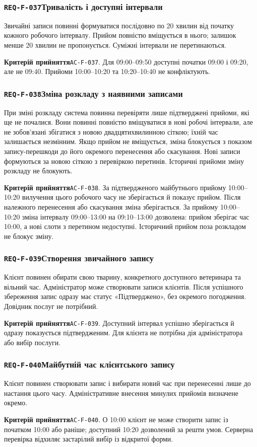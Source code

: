 \documentclass[11pt,a4paper]{article}
\newcommand{\requirement}[4]{%
  \Needspace{7\baselineskip}%
  \subsubsection*{\hypertarget{#1}{\texttt{#1}}\quad #2}%
  #3\par
  \textbf{Критерій прийняття}\quad #4\par\medskip}
\begin{document}
\requirement{REQ-F-037}{Тривалість і доступні інтервали}{Звичайні записи повинні формуватися послідовно по 20 хвилин від початку кожного робочого інтервалу. Прийом повністю вміщується в нього; залишок менше 20 хвилин не пропонується. Суміжні інтервали не перетинаються.}{\hypertarget{AC-F-037}{\texttt{AC-F-037}}. Для 09:00–09:50 доступні початки 09:00 і 09:20, але не 09:40. Прийоми 10:00–10:20 та 10:20–10:40 не конфліктують.}

\requirement{REQ-F-038}{Зміна розкладу з наявними записами}{При зміні розкладу система повинна перевіряти лише підтверджені прийоми, які ще не почалися. Вони повинні повністю вміщуватися в нові робочі інтервали, але не зобов’язані збігатися з новою двадцятихвилинною сіткою; їхній час залишається незмінним. Якщо прийом не вміщується, зміна блокується з показом запису-перешкоди до його окремого перенесення або скасування. Нові записи формуються за новою сіткою з перевіркою перетинів. Історичні прийоми зміну розкладу не блокують.}{\hypertarget{AC-F-038}{\texttt{AC-F-038}}. За підтвердженого майбутнього прийому 10:00–10:20 вилучення цього робочого часу не зберігається й показує прийом. Після належного перенесення або скасування зміна зберігається. За прийому 10:00–10:20 зміна інтервалу 09:00–13:00 на 09:10–13:00 дозволена: прийом зберігає час 10:00, а нові слоти з перетином недоступні. Історичний прийом поза розкладом не блокує зміну.}

\requirement{REQ-F-039}{Створення звичайного запису}{Клієнт повинен обирати свою тварину, конкретного доступного ветеринара та вільний час. Адміністратор може створювати записи клієнтів. Після успішного збереження запис одразу має статус «Підтверджено», без окремого погодження. Довідник послуг не потрібний.}{\hypertarget{AC-F-039}{\texttt{AC-F-039}}. Доступний інтервал успішно зберігається й одразу показується підтвердженим. Для клієнта не потрібна дія адміністратора або вибір послуги.}

\requirement{REQ-F-040}{Майбутній час клієнтського запису}{Клієнт повинен створювати запис і вибирати новий час при перенесенні лише до настання цього часу. Адміністративне внесення минулих прийомів визначене окремо.}{\hypertarget{AC-F-040}{\texttt{AC-F-040}}. О 10:00 клієнт не може створити запис із початком 10:00 або раніше; доступний 10:20 дозволений за решти умов. Серверна перевірка відхиляє застарілий вибір із відкритої форми.}
\end{document}
